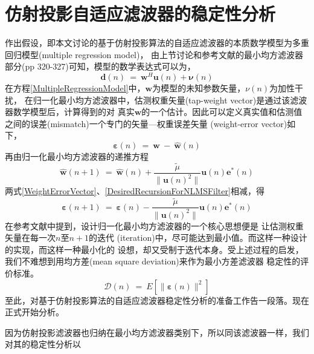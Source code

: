 \section{仿射投影自适应滤波器的稳定性分析}
作出假设，即本文讨论的基于仿射投影算法的自适应滤波器的本质数学模型为多重回归模型(multiple regression model)，
由上节讨论和参考文献的最小均方滤波器部分(pp 320-327)可知，模型的数学表达式可以为，
\begin{equation}\label{MultipleRegressionModel}
    \mathbf{d}(n) ~=~ \mathbf{w}^{H}\mathbf{u}(n)+ \mathbf{\nu}(n)
\end{equation}
在方程\eqref{MultipleRegressionModel}中，$\mathbf{w}$为模型的未知参数矢量，$\nu(n)$为加性干扰，
在归一化最小均方滤波器中，估测权重矢量(tap-weight vector)是通过该滤波器数学模型后，计算得到的对
真实$\mathbf{w}$的一个估计。因此可以定义真实值和估测值之间的误差(mismatch)一个专门的矢量---权重误差矢量
(weight-error vector)如下，
\begin{equation}\label{WeightErrorVector}
    \boldsymbol{\varepsilon}(n) ~=~ \mathbf{w}~-~\hat{\mathbf{w}}(n)
\end{equation}
再由归一化最小均方滤波器的递推方程
\begin{equation}\label{DesiredRecursionForNLMSFilter}
    \hat{\mathbf{w}}(n+1)~=~\hat{\mathbf{w}}(n)+\frac{\tilde{\mu}}{\|\mathbf{u}(n)^{2}\|}
    \mathbf{u}(n)\mathbf{e}^{*}(n)
\end{equation}
两式\eqref{WeightErrorVector}、\eqref{DesiredRecursionForNLMSFilter}相减，得
\begin{equation}\label{UpdatedWeightErrorVector}
    \boldsymbol{\varepsilon}(n+1)~=~\boldsymbol{\varepsilon}(n)-
    \frac{\tilde{\mu}}{\|\mathbf{u}(n)^{2}\|}\mathbf{u}(n)\mathbf{e}^{*}(n)
\end{equation}
在参考文献中提到，设计归一化最小均方滤波器的一个核心思想便是
让估测权重矢量在每一次$n$至$n+1$的迭代 (iteration)中，尽可能达到最小值。而这样一种设计的实现，而这样一种最小化的
设想，却又受制于迭代本身。受上述过程的启发，我们不难想到用均方差(mean square deviation)来作为最小方差滤波器
稳定性的评价标准。
\begin{equation}\label{MeanSquareDeviation}
    \mathscr{D}(n)~=~E[\|\boldsymbol{\varepsilon}(n)\|^{2}]
\end{equation}
至此，对基于仿射投影算法的自适应滤波器稳定性分析的准备工作告一段落。现在正式开始分析。
\par
因为仿射投影滤波器也归纳在最小均方滤波器类别下，所以同该滤波器一样，我们对其的稳定性分析以
